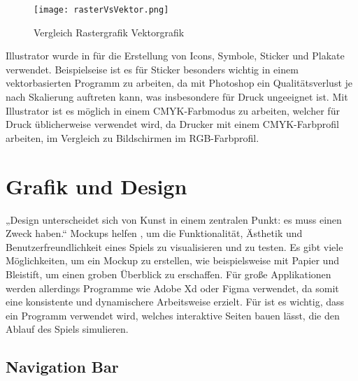 \begin{figure}[H]
    \centering
    \texttt{[image: rasterVsVektor.png]}
    \caption{Vergleich Rastergrafik Vektorgrafik}
\end{figure}

Illustrator wurde in \FF für die Erstellung von Icons, Symbole, Sticker und Plakate verwendet. Beispielseise ist es für Sticker besonders wichtig in einem vektorbasierten Programm zu arbeiten, da mit Photoshop ein Qualitätsverlust je nach Skalierung auftreten kann, was insbesondere für Druck ungeeignet ist. Mit Illustrator ist es möglich in einem CMYK-Farbmodus zu arbeiten, welcher für Druck üblicherweise verwendet wird, da Drucker mit einem CMYK-Farbprofil arbeiten, im Vergleich zu Bildschirmen im RGB-Farbprofil.

\section{Grafik und Design}

„Design unterscheidet sich von Kunst in einem zentralen Punkt: es muss einen Zweck haben.“  Mockups
helfen
, um
die
Funktionalität, Ästhetik und Benutzerfreundlichkeit eines Spiels zu visualisieren und zu testen. Es gibt viele Möglichkeiten, um ein Mockup zu erstellen, wie beispielsweise mit Papier und Bleistift, um einen groben Überblick zu erschaffen. Für große Applikationen werden allerdings Programme wie Adobe Xd oder Figma verwendet, da somit eine konsistente und dynamischere Arbeitsweise erzielt. Für \FF ist es wichtig, dass ein Programm verwendet wird, welches interaktive Seiten bauen lässt, die den Ablauf des Spiels simulieren.

\subsection{Navigation Bar}

